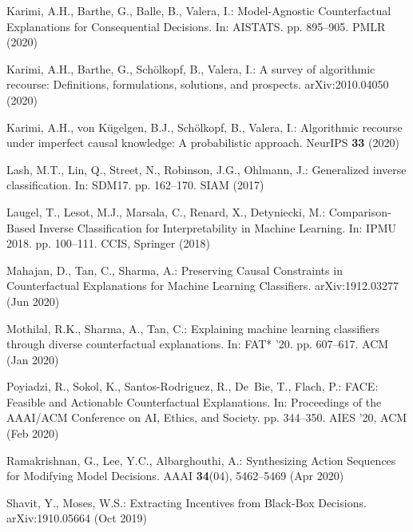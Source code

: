 \documentclass[runningheads, envcountsame, a4paper]{llncs}
\begin{document}
\begin{thebibliography}{10}
Karimi, A.H., Barthe, G., Balle, B., Valera, I.: Model-{{Agnostic
  Counterfactual Explanations}} for {{Consequential Decisions}}. In: AISTATS.
  pp. 895--905. {PMLR} (2020)

Karimi, A.H., Barthe, G., Sch{\"o}lkopf, B., Valera, I.: A survey of
  algorithmic recourse: Definitions, formulations, solutions, and prospects.
  arXiv:2010.04050  (2020)

Karimi, A.H., {von K{\"u}gelgen}, B.J., Sch{\"o}lkopf, B., Valera, I.:
  Algorithmic recourse under imperfect causal knowledge: A probabilistic
  approach. NeurIPS  \textbf{33} (2020)

Lash, M.T., Lin, Q., Street, N., Robinson, J.G., Ohlmann, J.: Generalized
  inverse classification. In: SDM17. pp. 162--170. {SIAM} (2017)

Laugel, T., Lesot, M.J., Marsala, C., Renard, X., Detyniecki, M.:
  Comparison-{{Based Inverse Classification}} for {{Interpretability}} in
  {{Machine Learning}}. In: IPMU 2018. pp. 100--111. {CCIS}, {Springer} (2018)

Mahajan, D., Tan, C., Sharma, A.: Preserving {{Causal Constraints}} in
  {{Counterfactual Explanations}} for {{Machine Learning Classifiers}}.
  arXiv:1912.03277  (Jun 2020)

Mothilal, R.K., Sharma, A., Tan, C.: Explaining machine learning classifiers
  through diverse counterfactual explanations. In: {{FAT}}* '20. pp. 607--617.
  ACM (Jan 2020)

Poyiadzi, R., Sokol, K., {Santos-Rodriguez}, R., De~Bie, T., Flach, P.:
  {{FACE}}: {{Feasible}} and {{Actionable Counterfactual Explanations}}. In:
  Proceedings of the {{AAAI}}/{{ACM Conference}} on {{AI}}, {{Ethics}}, and
  {{Society}}. pp. 344--350. {{AIES}} '20, ACM (Feb 2020)

Ramakrishnan, G., Lee, Y.C., Albarghouthi, A.: Synthesizing {{Action
  Sequences}} for {{Modifying Model Decisions}}. AAAI  \textbf{34}(04),
  5462--5469 (Apr 2020)

Shavit, Y., Moses, W.S.: Extracting {{Incentives}} from {{Black}}-{{Box
  Decisions}}. arXiv:1910.05664  (Oct 2019)


\end{thebibliography}
\end{document}
